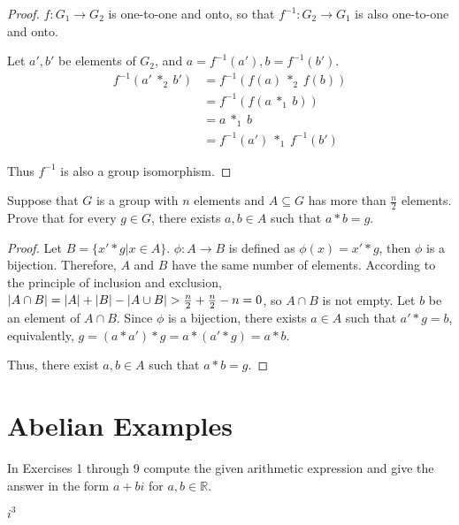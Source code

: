 \begin{proof}
    $f: G_{1} \to G_{2}$ is one-to-one and onto, so that $f^{-1}: G_{2} \to G_{1}$ is also one-to-one and onto.

    Let $a', b'$ be elements of $G_{2}$, and $a = f^{-1}(a'), b = f^{-1}(b')$.
    \begin{align*}
        f^{-1}(a'\ {*}_{2}\ b') & = f^{-1}(f(a)\ {*}_{2}\ f(b))     \\
                                & = f^{-1}(f(a\ {*}_{1}\ b))        \\
                                & = a\ {*}_{1}\ b                   \\
                                & = f^{-1}(a')\ {*}_{1}\ f^{-1}(b')
    \end{align*}

    Thus $f^{-1}$ is also a group isomorphism.
\end{proof}

\begin{exercise}
    Suppose that $G$ is a group with $n$ elements and $A\subseteq G$ has more than $\frac{n}{2}$ elements. Prove that for every $g\in G$, there exists $a, b\in A$ such that $a * b = g$.
\end{exercise}

\begin{proof}
    Let $B = \{ x' * g \vert x\in A \}$. $\phi: A\to B$ is defined as $\phi(x) = x' * g$, then $\phi$ is a bijection. Therefore, $A$ and $B$ have the same number of elements. According to the principle of inclusion and exclusion, $\left\vert{A\cap B}\right\vert = \left\vert{A}\right\vert + \left\vert{B}\right\vert - \left\vert{A\cup B}\right\vert > \frac{n}{2} + \frac{n}{2} - n = 0$, so $A\cap B$ is not empty. Let $b$ be an element of $A\cap B$. Since $\phi$ is a bijection, there exists $a\in A$ such that $a' * g = b$, equivalently, $g = (a * a') * g = a * (a' * g) = a * b$.

    Thus, there exist $a, b\in A$ such that $a * b = g$.
\end{proof}

\section{Abelian Examples}

\setcounter{exercise}{0}

In Exercises 1 through 9 compute the given arithmetic expression and give the answer in the form $a + bi$ for $a, b\in \mathbb{R}$.

\begin{exercise}
    $i^{3}$
\end{exercise}

